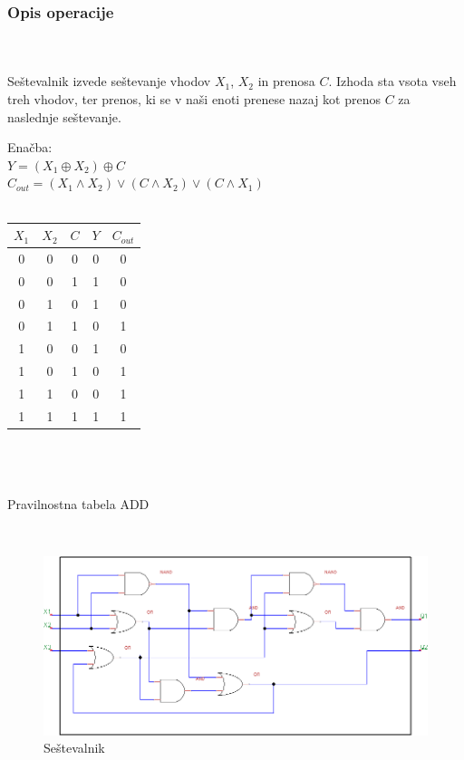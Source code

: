 \documentclass[seminar, slovene]{FRIreport}
\begin{document}
\subsubsection{Opis operacije}\ \\ \ \\
Seštevalnik izvede seštevanje vhodov $X_1$, $X_2$ in prenosa $C$. Izhoda sta vsota vseh treh vhodov, ter prenos, ki se v naši enoti prenese nazaj kot prenos $C$ za naslednje seštevanje.
\ \\
\begin{table}[H]
\begin{center}
Enačba:\\
$Y = (X_1 \oplus X_2) \oplus C$\\
$C_{out} = (X_1 \wedge X_2) \vee (C \wedge X_2) \vee (C \wedge X_1) $\\ \ \\
\begin{tabular}{ | c | c | c || c | c | }\hline
$X_1$ & $X_2$ & $C$ & $Y$ & $C_{out}$ \\ \hline
0 & 0 & 0 & 0 & 0\\
0 & 0 & 1 & 1 & 0\\
0 & 1 & 0 & 1 & 0\\
0 & 1 & 1 & 0 & 1\\
1 & 0 & 0 & 1 & 0\\
1 & 0 & 1 & 0 & 1\\
1 & 1 & 0 & 0 & 1\\
1 & 1 & 1 & 1 & 1\\ \hline
\end{tabular}\\ \ \\ \ \\
Pravilnostna tabela ADD
\end{center}
\end{table}
\ \\
\begin{figure}[H]
\includegraphics[width=14cm]{vezja/img/adder}
\caption{Seštevalnik}
\label{sestevalnik}
\end{figure}
\end{document}
